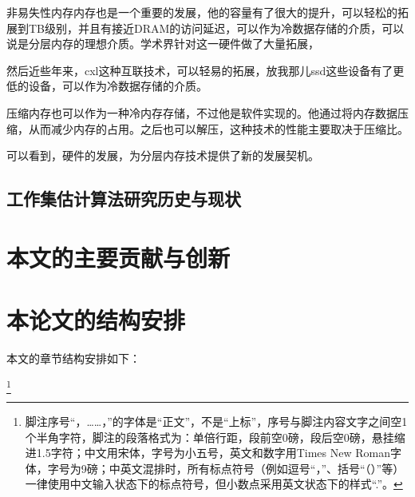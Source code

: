 非易失性内存内存也是一个重要的发展，他的容量有了很大的提升，可以轻松的拓展到TB级别，并且有接近DRAM的访问延迟，可以作为冷数据存储的介质，可以说是分层内存的理想介质。学术界针对这一硬件做了大量拓展，

然后近些年来，cxl这种互联技术，可以轻易的拓展，放我那儿ssd这些设备有了更低的设备，可以作为冷数据存储的介质。

压缩内存也可以作为一种冷内存存储，不过他是软件实现的。他通过将内存数据压缩，从而减少内存的占用。之后也可以解压，这种技术的性能主要取决于压缩比。

可以看到，硬件的发展，为分层内存技术提供了新的发展契机。

\subsection{工作集估计算法研究历史与现状}
\section{本文的主要贡献与创新}


\section{本论文的结构安排}
本文的章节结构安排如下：

\footnote{脚注序号“，……，”的字体是“正文”，不是“上标”，序号与脚注内容文字之间空1个半角字符，脚注的段落格式为：单倍行距，段前空0磅，段后空0磅，悬挂缩进1.5字符；中文用宋体，字号为小五号，英文和数字用Times New Roman字体，字号为9磅；中英文混排时，所有标点符号（例如逗号“，”、括号“（）”等）一律使用中文输入状态下的标点符号，但小数点采用英文状态下的样式“.”。}